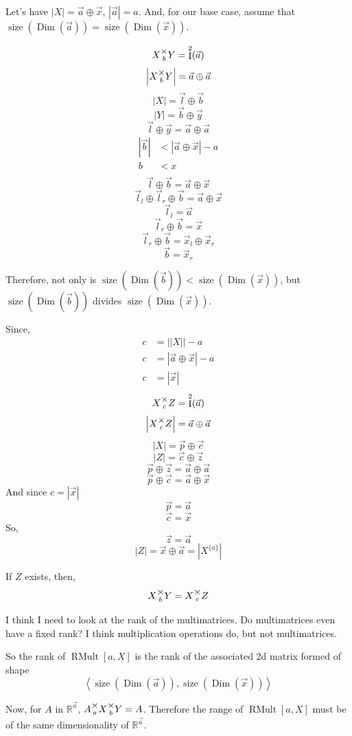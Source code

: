 \documentclass[12pt]{book}
\theoremstyle{plain}
\theoremstyle{definition}
\theoremstyle{ppart}
\theoremstyle{case}
\theoremstyle{solution}
\DeclareMathOperator{\Dim}{Dim}
\DeclareMathOperator{\Ident}{I}
\DeclareMathOperator{\RMult}{RMult}
\DeclareMathOperator{\size}{size}
\newcommand{\mmult}[1]{\text{\raisebox{1ex}{$\underset{#1}{\times}$}}}
\newcommand{\shape}[1]{\left|#1\right|}
\newcommand{\transpose}[2]{{#1}^{\{#2\}}}
\begin{document}
\begin{appendices}
\begin{landscape}
Let's have $\shape{X} = \vec{a} \oplus \vec{x}$, $\shape{\vec{a}} = a$.
And, for our base case, assume that $\size(\Dim(\vec{a})) = \size(\Dim(\vec{x}))$.

\[ X \mmult{b} Y = \Ident^2(\vec{a}) \]
\[ \shape{X \mmult{b} Y} = \vec{a} \oplus \vec{a} \]
\[ \shape{X} = \vec{l} \oplus \vec{b} \]
\[ \shape{Y} = \vec{b} \oplus \vec{y} \]
\[ \vec{l} \oplus \vec{y} = \vec{a} \oplus \vec{a} \]
\begin{align*}
  \shape{\vec{b}} &< \shape{\vec{a} \oplus \vec{x}}-a \\
  b &< x \\
\end{align*}
\[ \vec{l} \oplus \vec{b} = \vec{a} \oplus \vec{x} \]
\[ \vec{l}_l \oplus \vec{l}_r \oplus \vec{b} = \vec{a} \oplus \vec{x} \]
\[ \vec{l}_l = \vec{a} \]
\[ \vec{l}_r \oplus \vec{b} = \vec{x} \]
\[ \vec{l}_r \oplus \vec{b} = \vec{x}_l \oplus \vec{x}_r \]
\[ \vec{b} = \vec{x}_r \]

Therefore, not only is $\size(\Dim(\vec{b})) < \size(\Dim(\vec{x}))$, but $\size(\Dim(\vec{b}))$ divides $\size(\Dim(\vec{x}))$.

Since,
\begin{align*}
  c &= \shape{\shape{X}}-a \\
  c &= \shape{\vec{a} \oplus \vec{x}}-a \\
  c &= \shape{\vec{x}}
\end{align*}
\[ X \mmult{c} Z = \Ident^2(\vec{a}) \]
\[ \shape{X \mmult{c} Z} = \vec{a} \oplus \vec{a} \]
\[ \shape{X} = \vec{p} \oplus \vec{c} \]
\[ \shape{Z} = \vec{c} \oplus \vec{z} \]
\[ \vec{p} \oplus \vec{z} = \vec{a} \oplus \vec{a} \]
\[ \vec{p} \oplus \vec{c} = \vec{a} \oplus \vec{x} \]
And since $c = \shape{\vec{x}}$
\[ \vec{p} = \vec{a} \]
\[ \vec{c} = \vec{x} \]
So,
\[ \vec{z} = \vec{a} \]
\[ \shape{Z} = \vec{x} \oplus \vec{a} = \shape{\transpose{X}{a}} \]

If $Z$ exists, then,
\[ X \mmult{b} Y = X \mmult{c} Z \]

I think I need to look at the rank of the multimatrices. Do multimatrices even have a fixed rank? I think multiplication operations do, but not multimatrices.

So the rank of $\RMult[a, X]$ is the rank of the associated 2d matrix formed of shape
\[ \left<\size(\Dim(\vec{a})), \size(\Dim(\vec{x}))\right> \]

Now, for $A$ in $\mathbb{R}^{\vec{a}}$, $A \mmult{a} X \mmult{b} Y = A$. Therefore the range of $\RMult[a,X]$ must be of the same dimensionality of $\mathbb{R}^{\vec{a}}$.


\end{landscape}
\end{appendices}
\end{document}
